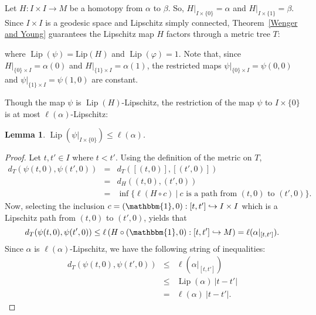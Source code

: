 \documentclass{article}
\newtheorem{lemma}[theorem]{Lemma}
\theoremstyle{definition}
\theoremstyle{remark}
\def\id{\mathbbm{1}}
\newcommand{\length}[1]{\ell}%
\newcommand{\lip}[1]{\text{Lip}(#1)}
\DeclareMathOperator{\Lip}{Lip}
\begin{document}
 Let $H:I\times I\rightarrow M$ be a homotopy from $\alpha$ to $\beta$. So, $H|_{I\times\{0\}}=\alpha$ and $H|_{I\times\{1\}}=\beta$. Since $I\times I$ is a geodesic space and Lipschitz simply connected, Theorem~\ref{Wenger and Young} guarantees the Lipschitz map $H$ factors through a metric tree $T$:
\begin{center}
\end{center}
where $\Lip(\psi)=\lip{H}$ and $\Lip(\varphi)=1$. Note that, since $H|_{\{0\}\times I}=\alpha(0)$ and $H|_{\{1\}\times I}=\alpha(1)$, the restricted maps $\psi|_{\{0\}\times I}=\psi(0,0)$ and $\psi|_{\{1\}\times I}=\psi(1,0)$ are constant. 

Though the map $\psi$ is $\Lip(H)$-Lipschitz, the restriction of the map $\psi$ to $I\times\{0\}$ is at most $\length{M}(\alpha)$-Lipschitz:

\begin{lemma}\label{Restriction is path Lipschitz}
$\Lip\left(\psi|_{I\times\{0\}}\right)\leq\length{M}(\alpha)$.
\end{lemma}
\begin{proof}
Let $t,t'\in I$ where $t<t'$. Using the definition of the metric on $T$, 
\begin{eqnarray*}
d_T(\psi(t,0),\psi(t',0)) & = & d_T([(t,0)],[(t',0)]) \\
						  & = & d_H((t,0),(t',0)) \\
						  & = & \inf\{\length{M}(H\circ c)~|~c\text{ is a path from }(t,0)\text{ to }(t',0)\}.
\end{eqnarray*}
Now, selecting the inclusion $c=(\id,0):[t,t']\hookrightarrow I\times I$ which is a Lipschitz path from $(t,0)$ to $(t',0)$, yields that 
\[
d_T(\psi(t,0),\psi(t',0))\leq\length{M}\left(H\circ(\id,0):[t,t']\hookrightarrow M\right)=\length{M}(\alpha|_{[t,t']}).
\]
Since $\alpha$ is $\length{M}(\alpha)$-Lipschitz, we have the following string of inequalities:
\begin{eqnarray*}
d_T(\psi(t,0),\psi(t',0)) & \leq  & \length{M}(\alpha|_{[t,t']}) \\
						  & \leq & \Lip(\alpha)~|t-t'| \\
						  & = & \length{M}(\alpha)~|t-t'|.
\end{eqnarray*}


\end{proof}
\end{document}

